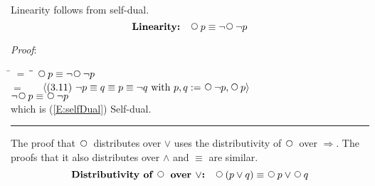 \documentclass[12pt, fleqn, leqno]{article}
\newcommand{\lgap}{2pt}                             %
\newcommand{\mymathindent}{24pt}                    %
\newcommand{\impl}{\ensuremath{\Rightarrow}}        %
\newcommand{\Next}{\;\,\text{\raisebox{3.5pt}{\circle{6}}}}
\newcommand{\myqed}{\rule[-.23ex]{1.2ex}{2.0ex}}
\newcommand{\myqedtab}{\hspace{384pt}}              %
\newcommand{\Gll} {\langle}                         %
\newcommand{\Ggg} {\rangle}                         %
\newcommand{\Hint}[1]     {\ \ \ $\Gll              \mbox{#1} \Ggg$ }   %
\begin{document}
Linearity follows from self-dual.
\begin{equation}\label{E:linearity}
\textbf{Linearity:}\quad \Next p \equiv \neg\Next\neg p
\end{equation}

\emph{Proof}:
\begin{tabbing}
\hspace{\mymathindent} \= $= \;$ \= \myqedtab \= \kill
  \> \>   $\Next p \equiv \neg\Next\neg p$\\[\lgap]
  \> $=$  \>  \Hint{(3.11) $\neg p \equiv q \equiv p \equiv \neg q$ with $p,q := \Next\neg p, \Next p$} \\[\lgap]
  \> \>   $\neg\Next p \equiv \Next\neg p$ \\[\lgap]
  \> which is (\ref{E:selfDual}) Self-dual. \quad \myqed
\end{tabbing}

The proof that $\Next$ distributes over $\lor$ uses the distributivity of $\Next$ over $\impl$.
The proofs that it also distributes over $\land$ and $\equiv$ are similar.
\begin{equation}\label{E:distNextOr}
\textbf{Distributivity of $\Next$ over $\lor$:}\quad \Next (p \lor q) \equiv \Next p \lor \Next q
\end{equation}
\end{document}

